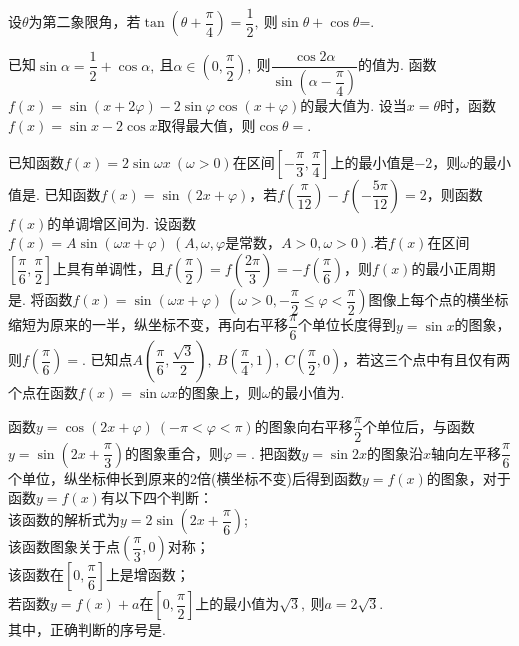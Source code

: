 \begin{questions}
\qs 设$\theta$为第二象限角，若$ \tan\left(\theta +\dfrac{\pi}{4}\right)=\dfrac{1}{2},\  $则$ \sin \theta+\cos \theta $=\tk.

\qs 已知$\sin \alpha=\dfrac{1}{2}+\cos \alpha,\ $且$ \alpha\in \left(0,\dfrac{\pi}{2}\right),\  $则$ \dfrac{\cos 2\alpha}{\sin \left(\alpha-\dfrac{\pi}{4}\right)} $的值为\tk.
\question 函数$f(x)=\sin \left(x+2\varphi\right)-2\sin \varphi \cos(x+\varphi)$的最大值为\tk.
\question 设当$x=\theta$时，函数$f(x)=\sin x-2\cos x$取得最大值，则$\cos \theta=$\tk.

\qs 已知函数$f(x)=2\sin \omega x\ (\omega>0)$在区间$ \left[-\dfrac{\pi}{3},\dfrac{\pi}{4}\right] $上的最小值是$ -2 $，则$ \omega $的最小值是\tk.
\qs 已知函数$f(x)=\sin (2x+\varphi)$，若$    f\left(\dfrac{\pi}{12}\right)-f\left(-\dfrac{5\pi}{12}\right)=2 $，则函数$f(x)$的单调增区间为\tk.
\qs 设函数$ f(x)=A\sin\left(\omega x+\varphi\right)\ \left(A,\omega,\varphi \text{是常数，}A>0,\omega>0\right)$.若$ f(x) $在区间$ \left[\dfrac{\pi}{6},\dfrac{\pi}{2}\right] $上具有单调性，且$f\left(\dfrac{\pi}{2}\right)=f\left(\dfrac{2\pi}{3}\right)=-f\left(\dfrac{\pi}{6}\right) $，则$ f(x) $的最小正周期是\tk.
\qs 将函数$f(x)=\sin (\omega x+\varphi)\ \left(\omega >0,-\dfrac{\pi}{2}\le \varphi<\dfrac{\pi}{2}\right)$图像上每个点的横坐标缩短为原来的一半，纵坐标不变，再向右平移$ \dfrac{\pi}{6} $个单位长度得到$ y=\sin x $的图象，则$ f\left(\dfrac{\pi}{6}\right) =$\tk.
\qs 已知点$ A\left(\dfrac{\pi}{6},\dfrac{\sqrt{3}}{2}\right),\ B\left(\dfrac{\pi}{4},1\right),\ C\left(\dfrac{\pi}{2},0\right)$，若这三个点中有且仅有两个点在函数$f(x)=\sin \omega x$的图象上，则$ \omega $的最小值为\tk.

\qs 函数$y=\cos (2x+\varphi)\ (-\pi<\varphi<\pi)$的图象向右平移$\dfrac{\pi}{2}$个单位后，与函数$y=\sin (2x+\dfrac{\pi}{3})$的图象重合，则$\varphi=$\tk.
\qs 把函数$ y=\sin 2x $的图象沿$x$轴向左平移$ \dfrac{\pi}{6} $个单位，纵坐标伸长到原来的2倍(横坐标不变)后得到函数$ y=f(x) $的图象，对于函数$ y=f(x) $有以下四个判断：\\
 该函数的解析式为$ y=2\sin \left(2x+\dfrac{\pi}{6}\right) $;\\
 该函数图象关于点$ \left(\dfrac{\pi}{3},0\right) $对称；\\
 该函数在$ \left[0,\dfrac{\pi}{6}\right] $上是增函数；\\
 若函数$ y=f(x)+a $在$ \left[0,\dfrac{\pi}{2}\right] $上的最小值为$ \sqrt{3},\  $则$ a=2\sqrt{3} .$\\
其中，正确判断的序号是\tk.





\end{questions}
